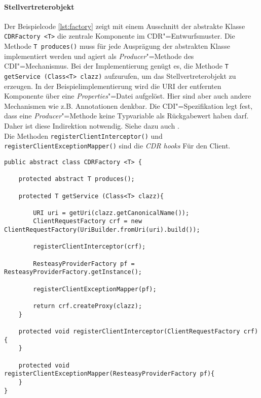 \paragraph{Stellvertreterobjekt}
Der Beispielcode \ref{lst:factory} zeigt mit einem Ausschnitt der abstrakte Klasse \colorbox{mygray}{\lstinline!CDRFactory <T>!} die zentrale Komponente im \ac{CDR}"=Entwurfsmuster.
Die Methode \colorbox{mygray}{\lstinline!T produces()!} muss für jede Ausprägung der abstrakten Klasse implementiert werden und agiert als \textit{Producer}"=Methode des \ac{CDI}"=Mechanismus. Bei der Implementierung genügt es, die Methode \colorbox{mygray}{\lstinline!T getService (Class<T> clazz)!} aufzurufen, um das Stellvertreterobjekt zu erzeugen. In der Beispielimplementierung wird die \ac{URI} der entfernten Komponente über eine \textit{Properties}"=Datei aufgelöst. Hier sind aber auch andere Mechanismen wie z.B. Annotationen denkbar.
Die \ac{CDI}"=Spezifikation legt fest, dass eine \textit{Producer}"=Methode keine Typvariable als Rückgabewert haben darf. Daher ist diese Indirektion notwendig. Siehe dazu auch \cite{group2009jsr299}.\\ 
Die Methoden \colorbox{mygray}{\lstinline!registerClientInterceptor()!} und \colorbox{mygray}{\lstinline!registerClientExceptionMapper()!} sind die \textit{CDR hooks} Für den Client. 
\begin{lstlisting}[caption={Abstrakte CDR"=Fabrik},captionpos=b,label=lst:factory] 
public abstract class CDRFactory <T> {	

	protected abstract T produces();

	protected T getService (Class<T> clazz){							
				
		URI uri = getUri(clazz.getCanonicalName());			
		ClientRequestFactory crf = new ClientRequestFactory(UriBuilder.fromUri(uri).build());	
		
		registerClientInterceptor(crf);	
		
		ResteasyProviderFactory pf = ResteasyProviderFactory.getInstance();
		
		registerClientExceptionMapper(pf);		

		return crf.createProxy(clazz);
	}
	
	protected void registerClientInterceptor(ClientRequestFactory crf){
	}
	
	protected void registerClientExceptionMapper(ResteasyProviderFactory pf){
	}
}
\end{lstlisting}
\newpage
